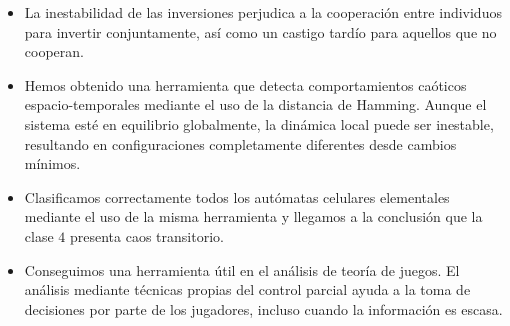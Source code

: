 \begin{itemize}

\item La inestabilidad de las inversiones perjudica a la cooperación entre individuos para invertir conjuntamente, así como un castigo tardío para aquellos que no cooperan.

\item Hemos obtenido una herramienta que detecta comportamientos caóticos espacio-temporales mediante el uso de la distancia de Hamming. Aunque el sistema esté en equilibrio globalmente, la dinámica local puede ser inestable, resultando en configuraciones completamente diferentes desde cambios mínimos.

\item Clasificamos correctamente todos los autómatas celulares elementales mediante el uso de la misma herramienta y llegamos a la conclusión que la clase $4$ presenta caos transitorio.

\item Conseguimos una herramienta útil en el análisis de teoría de juegos. El análisis mediante técnicas propias del control parcial ayuda a la toma de decisiones por parte de los jugadores, incluso cuando la información es escasa.



\end{itemize}
